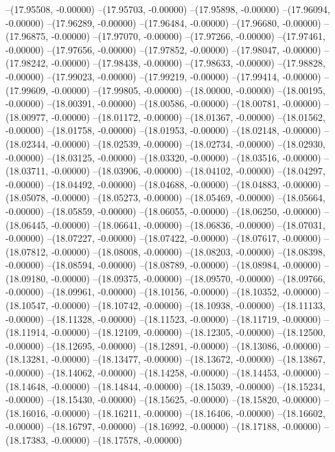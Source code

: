 --(17.95508, -0.00000)
--(17.95703, -0.00000)
--(17.95898, -0.00000)
--(17.96094, -0.00000)
--(17.96289, -0.00000)
--(17.96484, -0.00000)
--(17.96680, -0.00000)
--(17.96875, -0.00000)
--(17.97070, -0.00000)
--(17.97266, -0.00000)
--(17.97461, -0.00000)
--(17.97656, -0.00000)
--(17.97852, -0.00000)
--(17.98047, -0.00000)
--(17.98242, -0.00000)
--(17.98438, -0.00000)
--(17.98633, -0.00000)
--(17.98828, -0.00000)
--(17.99023, -0.00000)
--(17.99219, -0.00000)
--(17.99414, -0.00000)
--(17.99609, -0.00000)
--(17.99805, -0.00000)
--(18.00000, -0.00000)
--(18.00195, -0.00000)
--(18.00391, -0.00000)
--(18.00586, -0.00000)
--(18.00781, -0.00000)
--(18.00977, -0.00000)
--(18.01172, -0.00000)
--(18.01367, -0.00000)
--(18.01562, -0.00000)
--(18.01758, -0.00000)
--(18.01953, -0.00000)
--(18.02148, -0.00000)
--(18.02344, -0.00000)
--(18.02539, -0.00000)
--(18.02734, -0.00000)
--(18.02930, -0.00000)
--(18.03125, -0.00000)
--(18.03320, -0.00000)
--(18.03516, -0.00000)
--(18.03711, -0.00000)
--(18.03906, -0.00000)
--(18.04102, -0.00000)
--(18.04297, -0.00000)
--(18.04492, -0.00000)
--(18.04688, -0.00000)
--(18.04883, -0.00000)
--(18.05078, -0.00000)
--(18.05273, -0.00000)
--(18.05469, -0.00000)
--(18.05664, -0.00000)
--(18.05859, -0.00000)
--(18.06055, -0.00000)
--(18.06250, -0.00000)
--(18.06445, -0.00000)
--(18.06641, -0.00000)
--(18.06836, -0.00000)
--(18.07031, -0.00000)
--(18.07227, -0.00000)
--(18.07422, -0.00000)
--(18.07617, -0.00000)
--(18.07812, -0.00000)
--(18.08008, -0.00000)
--(18.08203, -0.00000)
--(18.08398, -0.00000)
--(18.08594, -0.00000)
--(18.08789, -0.00000)
--(18.08984, -0.00000)
--(18.09180, -0.00000)
--(18.09375, -0.00000)
--(18.09570, -0.00000)
--(18.09766, -0.00000)
--(18.09961, -0.00000)
--(18.10156, -0.00000)
--(18.10352, -0.00000)
--(18.10547, -0.00000)
--(18.10742, -0.00000)
--(18.10938, -0.00000)
--(18.11133, -0.00000)
--(18.11328, -0.00000)
--(18.11523, -0.00000)
--(18.11719, -0.00000)
--(18.11914, -0.00000)
--(18.12109, -0.00000)
--(18.12305, -0.00000)
--(18.12500, -0.00000)
--(18.12695, -0.00000)
--(18.12891, -0.00000)
--(18.13086, -0.00000)
--(18.13281, -0.00000)
--(18.13477, -0.00000)
--(18.13672, -0.00000)
--(18.13867, -0.00000)
--(18.14062, -0.00000)
--(18.14258, -0.00000)
--(18.14453, -0.00000)
--(18.14648, -0.00000)
--(18.14844, -0.00000)
--(18.15039, -0.00000)
--(18.15234, -0.00000)
--(18.15430, -0.00000)
--(18.15625, -0.00000)
--(18.15820, -0.00000)
--(18.16016, -0.00000)
--(18.16211, -0.00000)
--(18.16406, -0.00000)
--(18.16602, -0.00000)
--(18.16797, -0.00000)
--(18.16992, -0.00000)
--(18.17188, -0.00000)
--(18.17383, -0.00000)
--(18.17578, -0.00000)
